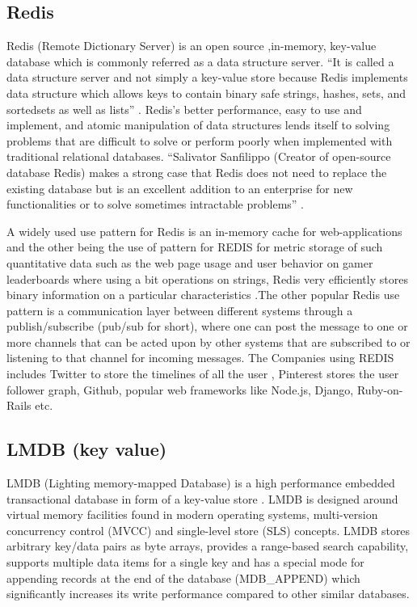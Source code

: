      \pv
     
\subsection{Redis}

     Redis (Remote Dictionary Server) is an open source ,in-memory,
     key-value database which is commonly referred as a data structure
     server. ``It is called a data structure server and not simply a
     key-value store because Redis implements data structure which
     allows keys to contain binary safe strings, hashes, sets, and
     sortedsets as well as lists'' \cite{redis-book-2011}.  Redis's
     better performance, easy to use and implement, and atomic
     manipulation of data structures lends itself to solving problems
     that are difficult to solve or perform poorly when implemented
     with traditional relational databases. ``Salivator
     Sanfilippo (Creator of open-source database Redis) makes a strong
     case that Redis does not need to replace the existing database
     but is an excellent addition to an enterprise for new
     functionalities or to solve sometimes intractable problems''
     \cite{redis-book-2016}.

     A widely used use pattern for Redis is an in-memory cache for
     web-applications and the other being the use of pattern for REDIS
     for metric storage of such quantitative data such as the web page
     usage and user behavior on gamer leaderboards where using a bit
     operations on strings, Redis very efficiently stores binary
     information on a particular characteristics
     \cite{redis-book-2016}.The other popular Redis use pattern is a
     communication layer between different systems through a
     publish/subscribe (pub/sub for short), where one can post the
     message to one or more channels that can be acted upon by other
     systems that are subscribed to or listening to that channel for
     incoming messages. The Companies using REDIS includes Twitter to
     store the timelines of all the user , Pinterest stores the user
     follower graph, Github, popular web frameworks like Node.js,
     Django, Ruby-on-Rails etc.

     \pv

\subsection{LMDB (key value)}

     LMDB (Lighting memory-mapped Database) is a high performance
     embedded transactional database in form of a key-value store
     \cite{www-keyvalue}. LMDB is designed around virtual memory
     facilities found in modern operating systems, multi-version
     concurrency control (MVCC) and single-level store (SLS)
     concepts. LMDB stores arbitrary key/data pairs as byte arrays,
     provides a range-based search capability, supports multiple data
     items for a single key and has a special mode for appending
     records at the end of the database (MDB\_APPEND) which
     significantly increases its write performance compared to other
     similar databases.

